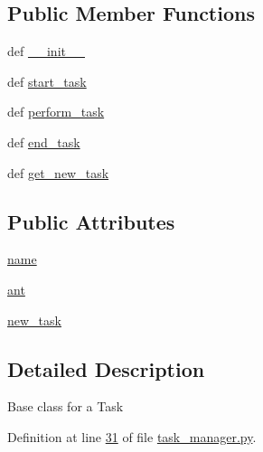 \subsection*{Public Member Functions}
\begin{DoxyCompactItemize}
\item 
def \hyperlink{classtask__manager_1_1Task_aab0d2d2ec0b4b3e87969d843a101e118}{\+\_\+\+\_\+init\+\_\+\+\_\+}
\item 
def \hyperlink{classtask__manager_1_1Task_aacfcc36829c22c789f31edaf60ef1cc4}{start\+\_\+task}
\item 
def \hyperlink{classtask__manager_1_1Task_a20da98293fb7cae0c80cc0caa864c025}{perform\+\_\+task}
\item 
def \hyperlink{classtask__manager_1_1Task_a9422ddc4ca06f29aed2bbd53bfde8da4}{end\+\_\+task}
\item 
def \hyperlink{classtask__manager_1_1Task_ab46cf79945b53ec633f6f52b37c7a5cb}{get\+\_\+new\+\_\+task}
\end{DoxyCompactItemize}
\subsection*{Public Attributes}
\begin{DoxyCompactItemize}
\item 
\hyperlink{classtask__manager_1_1Task_a1a12769253144bf3a864cdff907b9fb6}{name}
\item 
\hyperlink{classtask__manager_1_1Task_ac43e25887825a1bb6e3d4a5a049968be}{ant}
\item 
\hyperlink{classtask__manager_1_1Task_af16658f4c3c447e24f73ed3d1803e058}{new\+\_\+task}
\end{DoxyCompactItemize}


\subsection{Detailed Description}
\begin{DoxyVerb}Base class for a Task\end{DoxyVerb}
 

Definition at line \hyperlink{task__manager_8py_source_l00031}{31} of file \hyperlink{task__manager_8py_source}{task\+\_\+manager.\+py}.



